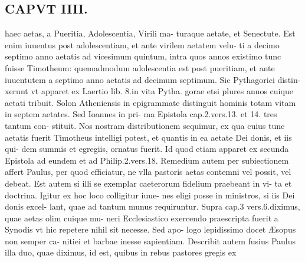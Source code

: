 \documentclass{article}
\begin{document}
\begin{pages}
\section*{CAPVT  IIII. }
\marginpar{[ p.229 ]}\pstart haec aetas, a Pueritia, Adolescentia, Virili ma- turaque aetate, et Senectute. Est enim iuuentus post adolescentiam, et ante virilem aetatem velu- ti a decimo septimo anno aetatis ad vicesimum quintum, intra quos annos existimo tunc fuisse Timotheum: quemadmodum adolescentia est post pueritiam, et ante iuuentutem a septimo anno aetatis ad decimum septimum. Sic Pythagorici distin- xerunt vt apparet ex Laertio lib. 8.in vita Pytha. gorae etsi plures annos cuique aetati tribuit. Solon Atheniensis in epigrammate distinguit hominis totam vitam in septem aetates. Sed Ioannes in pri- ma Epistola cap.2.vers.13. et 14. tres tantum con- stituit. Nos nostram distributionem sequimur, ex qua cuius tunc aetatis fuerit Timotheus intelligi potest, et quantis in ea aetate Dei donis, et iis qui- dem summis et egregiis, ornatus fuerit. Id quod etiam apparet ex secunda Epistola ad eundem et ad Philip.2.vers.18. Remedium autem per subiectionem affert Paulus, per quod efficiatur, ne vlla pastoris aetas contemni vel possit, vel debeat. Est autem si illi se exemplar caeterorum fidelium praebeant in vi- ta et doctrina. Igitur ex hoc loco colligitur iuue- nes eligi posse in ministros, si iis Dei donis excel- lant, quae ad tantum munus requiruntur. Supra cap.3 vers.6.diximus, quae aetas olim cuique mu- neri Ecclesiastico exercendo praescripta fuerit a Synodis vt hic repetere nihil sit necesse. Sed apo- logo lepidissimo docet Æsopus non semper ca- nitiei et barbae inesse sapientiam. Describit autem fusius Paulus illa duo, quae diximus, id est, quibus in rebus pastores gregis ex  \pend

\end{pages}
\end{document}
